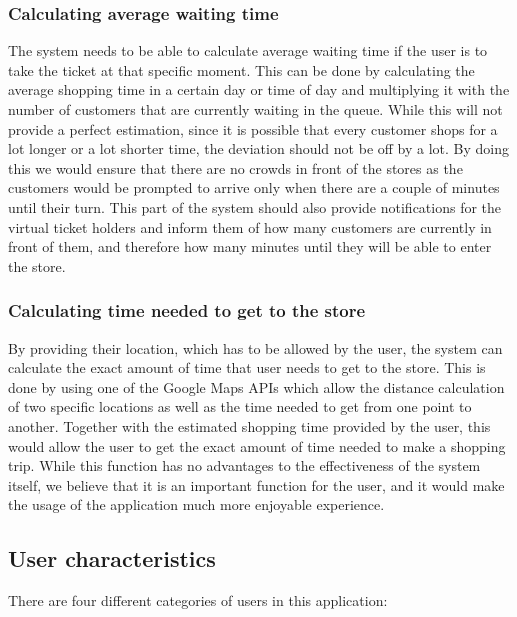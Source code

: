 \subsubsection{Calculating average waiting time}

\hspace{\parindent}The system needs to be able to calculate average waiting time if the user is to take the ticket at that specific moment. This can be done by calculating the average shopping time in a certain day or time of day and multiplying it with the number of customers that are currently waiting in the queue. While this will not provide a perfect estimation, since it is possible that every customer shops for a lot longer or a lot shorter time, the deviation should not be off by a lot. By doing this we would ensure that there are no crowds in front of the stores as the customers would be prompted to arrive only when there are a couple of minutes until their turn. This part of the system should also provide notifications for the virtual ticket holders and inform them of how many customers are currently in front of them, and therefore how many minutes until they will be able to enter the store. 

\subsubsection{Calculating time needed to get to the store}

\hspace{\parindent}By providing their location, which has to be allowed by the user, the system can calculate the exact amount of time that user needs to get to the store. This is done by using one of the Google Maps APIs which allow the distance calculation of two specific locations as well as the time needed to get from one point to another. Together with the estimated shopping time provided by the user, this would allow the user to get the exact amount of time needed to make a shopping trip. While this function has no advantages to the effectiveness of the system itself, we believe that it is an important function for the user, and it would make the usage of the application much more enjoyable experience.

\newpage

\subsection{User characteristics}
\hspace{\parindent} There are four different categories of users in this application:

